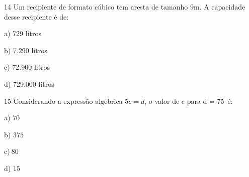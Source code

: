 \num{14} Um recipiente de formato cúbico tem aresta de tamanho 9m. A
capacidade desse recipiente é de:

a) 729 litros

b) 7.290 litros

c) 72.900 litros

d) 729.000 litros



\num{15} Considerando a expressão algébrica \(5c = d\), o valor de c para
d = 75\ é:

a) \(70\)

b) \(375\)

c)\(\ 80\)

d) \(15\)




